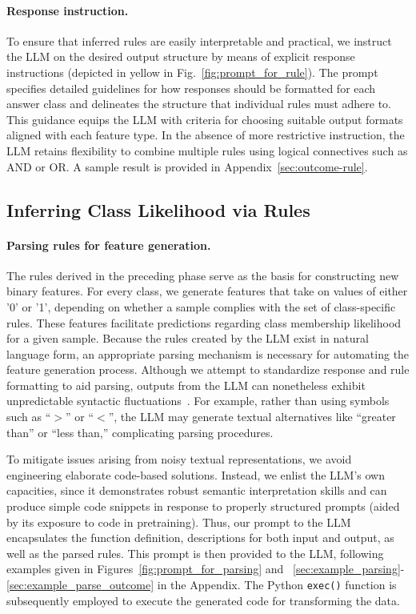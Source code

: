 \vspace*{-0.12in}
\paragraph{Response instruction.} To ensure that inferred rules are easily interpretable and practical, we instruct the LLM on the desired output structure by means of explicit response instructions (depicted in yellow in Fig.~\ref{fig:prompt_for_rule}). The prompt specifies detailed guidelines for how responses should be formatted for each answer class and delineates the structure that individual rules must adhere to. This guidance equips the LLM with criteria for choosing suitable output formats aligned with each feature type. In the absence of more restrictive instruction, the LLM retains flexibility to combine multiple rules using logical connectives such as AND or OR. A sample result is provided in Appendix~\ref{sec:outcome-rule}.

\subsection{Inferring Class Likelihood via Rules}
\label{Sec:training}

\paragraph{Parsing rules for feature generation.} The rules derived in the preceding phase serve as the basis for constructing new binary features. For every class, we generate features that take on values of either '0' or '1', depending on whether a sample complies with the set of class-specific rules. These features facilitate predictions regarding class membership likelihood for a given sample. Because the rules created by the LLM exist in natural language form, an appropriate parsing mechanism is necessary for automating the feature generation process. Although we attempt to standardize response and rule formatting to aid parsing, outputs from the LLM can nonetheless exhibit unpredictable syntactic fluctuations~\cite{kovavc2023large}. For example, rather than using symbols such as ``$>$” or ``$<$”, the LLM may generate textual alternatives like ``greater than” or ``less than,” complicating parsing procedures.

To mitigate issues arising from noisy textual representations, we avoid engineering elaborate code-based solutions. Instead, we enlist the LLM’s own capacities, since it demonstrates robust semantic interpretation skills and can produce simple code snippets in response to properly structured prompts (aided by its exposure to code in pretraining). Thus, our prompt to the LLM encapsulates the function definition, descriptions for both input and output, as well as the parsed rules. This prompt is then provided to the LLM, following examples given in Figures~\ref{fig:prompt_for_parsing} and ~\ref{sec:example_parsing}-\ref{sec:example_parse_outcome} in the Appendix. The Python \texttt{exec()} function is subsequently employed to execute the generated code for transforming the data.

